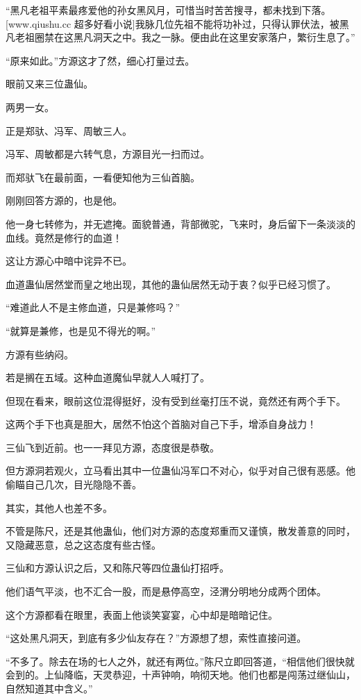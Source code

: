 \begin{this_body}
“黑凡老祖平素最疼爱他的孙女黑风月，可惜当时苦苦搜寻，都未找到下落。[www.qiushu.cc 超多好看小说]我脉几位先祖不能将功补过，只得认罪伏法，被黑凡老祖圈禁在这黑凡洞天之中。我之一脉。便由此在这里安家落户，繁衍生息了。”

“原来如此。”方源这才了然，细心打量过去。

眼前又来三位蛊仙。

两男一女。

正是郑驮、冯军、周敏三人。

冯军、周敏都是六转气息，方源目光一扫而过。

而郑驮飞在最前面，一看便知他为三仙首脑。

刚刚回答方源的，也是他。

他一身七转修为，并无遮掩。面貌普通，背部微驼，飞来时，身后留下一条淡淡的血线。竟然是修行的血道！

这让方源心中暗中诧异不已。

血道蛊仙居然堂而皇之地出现，其他的蛊仙居然无动于衷？似乎已经习惯了。

“难道此人不是主修血道，只是兼修吗？”

“就算是兼修，也是见不得光的啊。”

方源有些纳闷。

若是搁在五域。这种血道魔仙早就人人喊打了。

但现在看来，眼前这位混得挺好，没有受到丝毫打压不说，竟然还有两个手下。

这两个手下也真是胆大，居然不怕这个首脑对自己下手，增添自身战力！

三仙飞到近前。也一一拜见方源，态度很是恭敬。

但方源洞若观火，立马看出其中一位蛊仙冯军口不对心，似乎对自己很有恶感。他偷瞄自己几次，目光隐隐不善。

其实，其他人也差不多。

不管是陈尺，还是其他蛊仙，他们对方源的态度郑重而又谨慎，散发善意的同时，又隐藏恶意，总之这态度有些古怪。

三仙和方源认识之后，又和陈尺等四位蛊仙打招呼。

他们语气平淡，也不汇合一股，而是悬停高空，泾渭分明地分成两个团体。

这个方源都看在眼里，表面上他谈笑宴宴，心中却是暗暗记住。

“这处黑凡洞天，到底有多少仙友存在？”方源想了想，索性直接问道。

“不多了。除去在场的七人之外，就还有两位。”陈尺立即回答道，“相信他们很快就会到的。上仙降临，天灵恭迎，十声钟响，响彻天地。他们也都是闯荡过继仙山，自然知道其中含义。”


\end{this_body}
